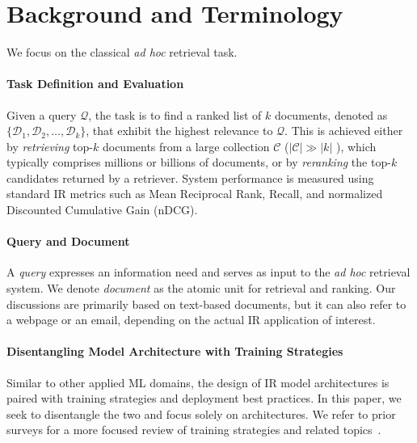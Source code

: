 \section{Background and Terminology}
\label{sec:background}

We focus on the classical \textit{ad hoc} retrieval task.

\paragraph{Task Definition and Evaluation} Given a query $\mathcal{Q}$, the task is to find a ranked list of $k$ documents, denoted as $\lbrace \mathcal{D}_1, \mathcal{D}_2, \ldots, \mathcal{D}_k \rbrace$, that exhibit the highest relevance to $\mathcal{Q}$. 
This is achieved either by \textit{retrieving} top-$k$ documents from a large collection $\mathcal{C}$ ($|\mathcal{C}| \gg |k|$ ), which typically comprises millions or billions of documents,
or by \textit{reranking} the top-$k$ candidates returned by a retriever. 
System performance is measured using standard IR metrics such as Mean Reciprocal Rank, Recall, and normalized Discounted Cumulative Gain (nDCG).

\paragraph{Query and Document}
A \textit{query} expresses an information need and serves as input to the \textit{ad hoc} retrieval system. We denote \textit{document} as the atomic unit for retrieval and ranking. Our discussions are primarily based on text-based documents, but it can also refer to a webpage or an email, depending on the actual IR application of interest.

\paragraph{Disentangling Model Architecture with Training Strategies}
Similar to other applied ML domains, the design of IR model architectures is paired with training strategies and deployment best practices.
In this paper, we seek to disentangle the two and focus solely on architectures.
We refer to prior surveys for a more focused review of training strategies and related topics~\cite{schutze2008introduction,lin2022pretrained,song2023llm}.
